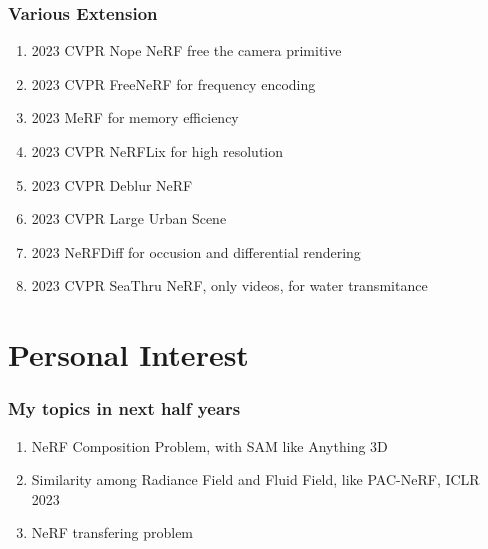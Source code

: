 \begin{frame}
    \frametitle{Various Extension}
    \begin{enumerate}
        \item 2023 CVPR Nope NeRF \cite{bianNoPeNeRFOptimisingNeural2023} free the camera primitive
        \item 2023 CVPR FreeNeRF \cite{yangFreeNeRFImprovingFewshot2023} for frequency encoding
        \item 2023 MeRF\cite{reiserMERFMemoryEfficientRadiance2023} for memory efficiency
        \item 2023 CVPR NeRFLix \cite{zhouNeRFLiXHighQualityNeural2023} for high resolution
        \item 2023 CVPR Deblur NeRF \cite{leeDPNeRFDeblurredNeural2023}
        \item 2023 CVPR Large Urban Scene \cite{xuGridguidedNeuralRadiance2023}
        \item 2023 NeRFDiff \cite{guNerfDiffSingleimageView2023} for occusion and differential rendering
        \item 2023 CVPR SeaThru NeRF, only videos, for water transmitance
    \end{enumerate}
\end{frame}

\section{Personal Interest}

\begin{frame}
    \frametitle{My topics in next half years}
    \begin{enumerate}
        \item NeRF Composition Problem, with SAM\cite{kirillovSegmentAnything2023} like Anything 3D\cite{shenAnything3DSingleviewAnything2023}
        \item Similarity among Radiance Field and Fluid Field, like PAC-NeRF\cite{liPACNeRFPhysicsAugmented2023}, ICLR 2023
        \item NeRF transfering problem
    \end{enumerate}
\end{frame}
